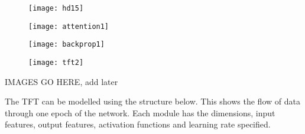 \documentclass{article}
\begin{document}
\begin{figure}[ht]
    \centering
    \texttt{[image: hd15]}
    \caption{}
\end{figure}
\begin{figure}[ht]
    \centering
    \texttt{[image: attention1]}
    \caption{}
\end{figure}
\begin{figure}[ht]
    \centering
    \texttt{[image: backprop1]}
    \caption{}
\end{figure}
\begin{figure}[ht]
    \centering
    \texttt{[image: tft2]}
    \caption{}
\end{figure}


\clearpage
IMAGES GO HERE, add later


The TFT can be modelled using the structure below. This shows the flow of data through one epoch of the network.  Each module has the dimensions, input features, output features, activation functions and learning rate specified.
\end{document}
